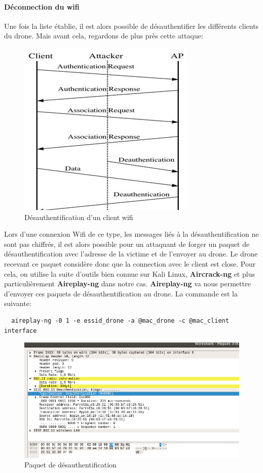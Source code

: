 \paragraph{Déconnection du wifi}
Une fois la liste établie, il est alors possible de désauthentifier les différents clients du drone. Mais avant cela, regardons de plus près cette attaque:

\begin{figure}[H]
  \centering
  \includegraphics[scale=1.5]{images/deauth}
  \caption{Désauthentification d'un client wifi}
\end{figure}

Lors d'une connexion Wifi de ce type, les messages liés à la désauthentification ne sont pas chiffrés, il est alors possible pour un attaquant de forger un paquet de désauthentification avec l'adresse de la victime et de l'envoyer au drone. Le drone recevant ce paquet considère donc que la connection avec le client est close. Pour cela, on utilise la suite d'outils bien connue sur Kali Linux, \textbf{Aircrack-ng} et plus particulièrement \textbf{Aireplay-ng} dans notre cas. \textbf{Aireplay-ng} va nous permettre d'envoyer ces paquets de désauthentification au drone. La commande est la suivante:
\begin{verbatim}
  aireplay-ng -0 1 -e essid_drone -a @mac_drone -c @mac_client interface
\end{verbatim}

\begin{figure}[H]
  \centering
  \includegraphics[scale=0.65]{images/wireshark}
  \caption{Paquet de désauthentification}
\end{figure}

